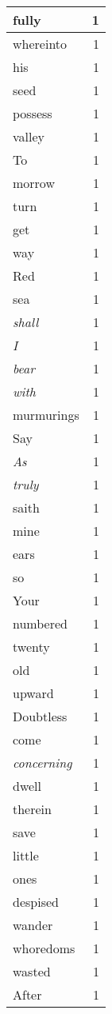 \begin{center}
\begin{longtable}{l|r}
fully & 1 \\ \hline
whereinto & 1 \\ \hline
his & 1 \\ \hline
seed & 1 \\ \hline
possess & 1 \\ \hline
valley & 1 \\ \hline
To & 1 \\ \hline
morrow & 1 \\ \hline
turn & 1 \\ \hline
get & 1 \\ \hline
way & 1 \\ \hline
Red & 1 \\ \hline
sea & 1 \\ \hline
\emph{shall} & 1 \\ \hline
\emph{I} & 1 \\ \hline
\emph{bear} & 1 \\ \hline
\emph{with} & 1 \\ \hline
murmurings & 1 \\ \hline
Say & 1 \\ \hline
\emph{As} & 1 \\ \hline
\emph{truly} & 1 \\ \hline
saith & 1 \\ \hline
mine & 1 \\ \hline
ears & 1 \\ \hline
so & 1 \\ \hline
Your & 1 \\ \hline
numbered & 1 \\ \hline
twenty & 1 \\ \hline
old & 1 \\ \hline
upward & 1 \\ \hline
Doubtless & 1 \\ \hline
come & 1 \\ \hline
\emph{concerning} & 1 \\ \hline
dwell & 1 \\ \hline
therein & 1 \\ \hline
save & 1 \\ \hline
little & 1 \\ \hline
ones & 1 \\ \hline
despised & 1 \\ \hline
wander & 1 \\ \hline
whoredoms & 1 \\ \hline
wasted & 1 \\ \hline
After & 1 \\ \hline

\end{longtable}
\end{center}
